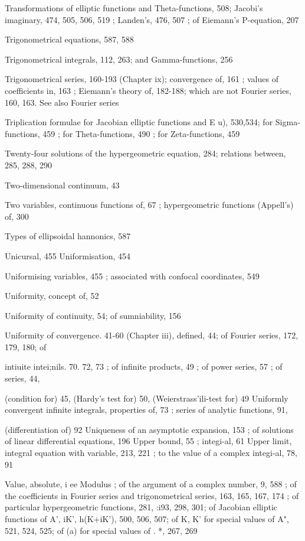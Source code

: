 Transformations of elliptic functions and Theta-functions, 508; Jacobi's imaginary, 474, 505,
506, 519 ; Landen's, 476, 507 ; of Eiemann's P-equation, 207

Trigonometrical equations, 587, 588

Trigonometrical integrals, 112, 263; and Gamma-functions, 256

Trigonometrical series, 160-193 (Chapter ix); convergence of, 161 ; values of coefficients in, 163 ;
Eiemann's theory of, 182-188; which are not Fourier series, 160, 163. See also Fourier series

Triplication formulae for Jacobian elliptic functions and E  u), 530,534; for Sigma-functions,
459 ; for Theta-functions, 490 ; for Zeta-functions, 459

Twenty-four solutions of the hypergeometric equation, 284; relations between, 285, 288, 290

Two-dimensional continuum, 43

Two variables, continuous functions of, 67 ; hypergeometric functions (Appell's) of, 300

Types of ellipsoidal hannonics, 587

Unicursal, 455
Uniformisation, 454


%
%

Uniformising variables, 455 ; associated with confocal coordinates, 549

Uniformity, concept of, 52

Uniformity of continuity, 54; of sumniability, 156

Uniformity of convergence. 41-60 (Chapter iii), defined, 44; of Fourier series, 172, 179, 180; of

intiuite intei;nils. 70. 72, 73 ; of infinite products, 49 ; of power series, 57 ; of series, 44,

(condition for) 45, (Hardy's test for) 50, (Weierstrass'ili-test for) 49
Uniformly convergent infinite integrals, properties of, 73 ; series of analytic functions, 91,

(differentiation of) 92
Uniqueness of an asymptotic expansion, 153 ; of solutions of linear differential equations, 196
Upper bound, 55 ; integi-al, 61
Upper limit, integral equation with variable, 213, 221 ; to the value of a complex integi-al, 78, 91

Value, absolute, i ee Modulus ; of the argument of a complex number, 9, 588 ; of the coefficients
in Fourier series and trigonometrical series, 163, 165, 167, 174 ; of particular hypergeometric
functions, 281, :i93, 298, 301; of Jacobian elliptic functions of  A',  iK', h(K+iK'), 500,
506, 507; of K, K' for special values of A", 521, 524, 525; of  (a) for special values of . *,
267, 269

